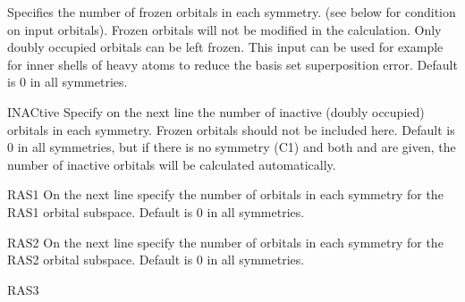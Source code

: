 \begin{keywordlist}
Specifies the number of frozen orbitals in each symmetry.
(see below for condition on input orbitals). Frozen
orbitals will not be modified in the calculation. Only doubly occupied
orbitals can be left frozen. This input can be used for example for
inner shells of heavy atoms to reduce the basis set superposition
error. Default is 0 in all symmetries.
\item[INACtive]
Specify on the next line the number of inactive (doubly occupied) orbitals in each
symmetry. Frozen orbitals should not be included here. Default is 0 in
all symmetries, but if there is no symmetry (C1) and both  and
 are given, the number of inactive orbitals will be calculated
automatically.
\item[RAS1]
On the next line specify the number of orbitals in each symmetry
for the RAS1 orbital subspace. Default is 0 in all symmetries.
\item[RAS2]
On the next line specify the number of orbitals in each symmetry
for the RAS2 orbital subspace. Default is 0 in all symmetries.
\item[RAS3]

\end{keywordlist}
